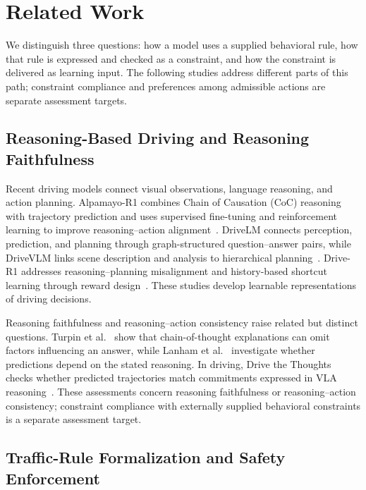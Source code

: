 \section{Related Work}\label{sec:related-work}

We distinguish three questions: how a model uses a supplied behavioral rule,
how that rule is expressed and checked as a constraint, and how the constraint
is delivered as learning input. The following studies address different parts
of this path; constraint compliance and preferences among admissible actions
are separate assessment targets.

\subsection{Reasoning-Based Driving and Reasoning Faithfulness}

Recent driving models connect visual observations, language reasoning,
and action planning. Alpamayo-R1 combines Chain of Causation (CoC)
reasoning with trajectory prediction and uses supervised fine-tuning
and reinforcement learning to improve reasoning--action
alignment~\cite{r1}. DriveLM connects perception, prediction, and
planning through graph-structured question--answer pairs, while
DriveVLM links scene description and analysis to hierarchical
planning~\cite{r2,r3}. Drive-R1 addresses reasoning--planning
misalignment and history-based shortcut learning through reward
design~\cite{r5}. These studies develop learnable representations of
driving decisions.\par

Reasoning faithfulness and reasoning--action consistency raise
related but distinct questions. Turpin et al.~\cite{Turpin2023} show that
chain-of-thought explanations can omit factors influencing an answer,
while Lanham et al.~\cite{Lanham2023} investigate whether predictions depend on the
stated reasoning. In driving, Drive the
Thoughts checks whether predicted trajectories match commitments
expressed in VLA reasoning~\cite{r18}. These assessments concern reasoning
faithfulness or reasoning--action consistency; constraint compliance with externally
supplied behavioral constraints is a separate assessment target.\par

\subsection{Traffic-Rule Formalization and Safety Enforcement}


